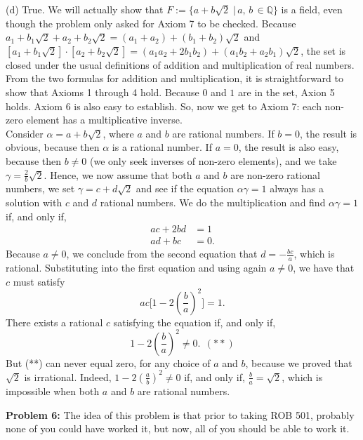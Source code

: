 \documentclass[letterpaper]{article}
\begin{document}
(d) True.  We will actually show that  ${F}:=\{a+b\sqrt{2}\;|\, a,\, b\,\in \mathbb{Q}\}$ is a field, even though the problem only asked for Axiom 7 to be checked. Because $a_1+b_1\sqrt{2}+a_2+b_2\sqrt{2}=(a_1+a_2)+(b_1+b_2)\sqrt{2}$ and $[a_1+b_1\sqrt{2}]\cdot[a_2+b_2\sqrt{2}]=(a_1a_2+ 2 b_1b_2)+(a_1b_2+a_2b_1)\sqrt{2}$, the set is closed under the usual definitions of addition and multiplication of real numbers. From the two formulas for addition and multiplication, it is straightforward to show that Axioms 1 through 4 hold. Because $0$ and $1$ are in the set, Axion 5 holds. Axiom 6 is also easy to establish. So, now we get to Axiom 7: each non-zero element has a multiplicative inverse.\\

Consider $\alpha = a + b\sqrt{2} $, where $a$ and $b$ are rational numbers. If $b=0$, the result is obvious, because then $\alpha$ is a rational number. If $a=0$, the result is also easy, because then $b \not = 0$ (we only seek inverses of non-zero elements), and we take $\gamma = \frac{2}{b} \sqrt{2}$. Hence, we now assume that both $a$ and $b$ are non-zero rational numbers, we set $\gamma=c + d \sqrt{2}$ and see if the equation $\alpha \gamma = 1$ always has a solution with $c$ and $d$ rational numbers. We do the multiplication and find  $\alpha \gamma = 1$  if, and only if,
\begin{align*}
ac + 2 bd &=1 \\
ad + bc &=0.
\end{align*}
Because $a\not = 0$, we conclude from the second equation that $d=-\frac{bc}{a}$, which is rational. Substituting into the first equation and using again $a\not=0$, we have that $c$ must satisfy
$$ac \big[ 1 - 2 \left(\frac{b}{a}\right)^2  \big]=1. $$
There exists a rational $c$ satisfying the equation if, and only if,
$$ 1 - 2 \left(\frac{b}{a}\right)^2 \not = 0.  ~~(**)$$
But (**) can never equal zero, for any choice of $a$ and $b$, because we proved that $\sqrt{2}$ is irrational. Indeed, $ 1 - 2 \left(\frac{a}{b}\right)^2 \not = 0  $ if, and only if, $\frac{b}{a} = \sqrt{2}$, which is impossible when both $a$ and $b$ are rational numbers.


\newpage

%

\noindent \textbf{Problem 6:} The idea of this problem is that prior to taking ROB 501, probably none of you could have worked it, but now, all of you should be able to work it. \\
\end{document}
